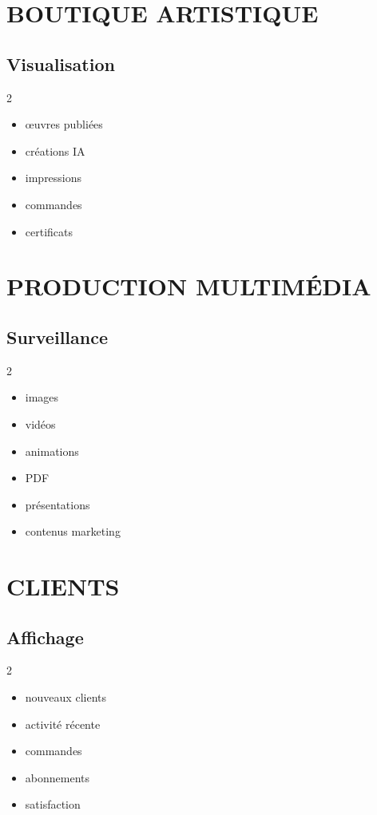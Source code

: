 \documentclass[12pt,a4paper,oneside]{book}
\begin{document}
\chapter{BOUTIQUE ARTISTIQUE}

\section{Visualisation}
\begin{multicols}{2}
\begin{itemize}
\item œuvres publiées
\item créations IA
\item impressions
\item commandes
\item certificats
\end{itemize}
\end{multicols}

\chapter{PRODUCTION MULTIMÉDIA}

\section{Surveillance}
\begin{multicols}{2}
\begin{itemize}
\item images
\item vidéos
\item animations
\item PDF
\item présentations
\item contenus marketing
\end{itemize}
\end{multicols}

\chapter{CLIENTS}

\section{Affichage}
\begin{multicols}{2}
\begin{itemize}
\item nouveaux clients
\item activité récente
\item commandes
\item abonnements
\item satisfaction
\end{itemize}
\end{multicols}
\end{document}
